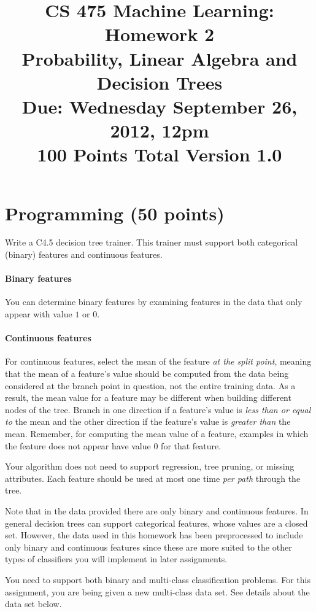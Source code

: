 \documentclass[11pt]{article}
\title{CS 475 Machine Learning: Homework 2\\Probability, Linear Algebra and Decision Trees\\
\Large{Due: Wednesday September 26, 2012, 12pm}\\
100 Points Total \hspace{1cm} Version 1.0}
\author{}
\date{}
\begin{document}
\large
\maketitle
\thispagestyle{headings}

\vspace{-.5in}
\section{Programming (50 points)}
Write a C4.5 decision tree trainer. This trainer must support both categorical (binary) features and continuous features.

\paragraph{Binary features} You can determine binary features by examining features in the data that only appear with value $1$ or $0$.

\paragraph{Continuous features}
For continuous features, select the mean of the feature {\em at the split point}, meaning that the mean of a feature's value should be computed from the data being considered at the branch point in question, not the entire training data. As a result, the mean value for a feature may be different when building different nodes of the tree. Branch in one direction if a feature's value is \emph{less than or equal to} the mean and the other direction if the feature's value is \emph{greater than} the mean. Remember, for computing the mean value of a feature, examples in which the feature does not appear have value $0$ for that feature.

Your algorithm does not need to support regression, tree pruning, or missing attributes. Each feature should be used at most one time \emph{per path} through the tree.

Note that in the data provided there are only binary and continuous features. In general decision trees can support categorical features, whose values are a closed set. However, the data used in this homework has been preprocessed to include only binary and continuous features since these are more suited to the other types of classifiers you will implement in later assignments.

You need to support both binary and multi-class classification problems. For this assignment, you are being given a new multi-class data set. See details
about the data set below.
\end{document}
